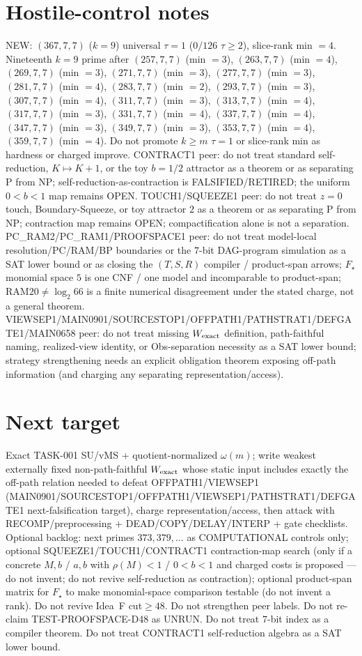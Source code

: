 \documentclass[11pt]{article}
\begin{document}
\section*{Hostile-control notes}
NEW: $(367,7,7)$ ($k{=}9$) universal $\tau{=}1$ ($0/126$ $\tau{\ge}2$), slice-rank min $=4$.
Nineteenth $k{=}9$ prime after $(257,7,7)$ (min $=3$), $(263,7,7)$ (min $=4$), $(269,7,7)$ (min $=3$), $(271,7,7)$ (min $=3$), $(277,7,7)$ (min $=3$), $(281,7,7)$ (min $=4$), $(283,7,7)$ (min $=2$), $(293,7,7)$ (min $=3$), $(307,7,7)$ (min $=4$), $(311,7,7)$ (min $=3$), $(313,7,7)$ (min $=4$), $(317,7,7)$ (min $=3$), $(331,7,7)$ (min $=4$), $(337,7,7)$ (min $=4$), $(347,7,7)$ (min $=3$), $(349,7,7)$ (min $=3$), $(353,7,7)$ (min $=4$), $(359,7,7)$ (min $=4$).
Do not promote $k{\ge}m$ $\tau{=}1$ or slice-rank min as hardness or charged improve.
CONTRACT1 peer: do not treat standard self-reduction, $K\mapsto K+1$, or the toy $b{=}1/2$ attractor as a theorem or as separating P from NP;
self-reduction-as-contraction is FALSIFIED/RETIRED; the uniform $0{<}b{<}1$ map remains OPEN.
TOUCH1/SQUEEZE1 peer: do not treat $z{=}0$ touch, Boundary-Squeeze, or toy attractor $2$ as a theorem or as separating P from NP;
contraction map remains OPEN; compactification alone is not a separation.
PC\_RAM2/PC\_RAM1/PROOFSPACE1 peer: do not treat model-local resolution/PC/RAM/BP boundaries or the $7$-bit DAG-program simulation as a SAT lower bound
or as closing the $(T,S,R)$ compiler / product-span arrows; $F_\star$ monomial space $5$ is one CNF / one model and incomparable to product-span;
RAM$20\neq\log_2 66$ is a finite numerical disagreement under the stated charge, not a general theorem.
VIEWSEP1/MAIN0901/SOURCESTOP1/OFFPATH1/PATHSTRAT1/DEFGATE1/MAIN0658 peer: do not treat missing $W_{\rm exact}$ definition,
path-faithful naming, realized-view identity, or Obs-separation necessity as a SAT lower bound;
strategy strengthening needs an explicit obligation theorem exposing off-path information
(and charging any separating representation/access).

\section*{Next target}
Exact TASK-001 SU/vMS + quotient-normalized $\omega(m)$; write weakest externally fixed non-path-faithful
$W_{\rm exact}$ whose static input includes exactly the off-path relation needed to defeat OFFPATH1/VIEWSEP1
(MAIN0901/SOURCESTOP1/OFFPATH1/VIEWSEP1/PATHSTRAT1/DEFGATE1 next-falsification target), charge representation/access,
then attack with RECOMP/preprocessing + DEAD/COPY/DELAY/INTERP + gate checklists.
Optional backlog: next primes $373,379,\ldots$ as COMPUTATIONAL controls only;
optional SQUEEZE1/TOUCH1/CONTRACT1 contraction-map search (only if a concrete $M,b$ / $a,b$ with $\rho(M){<}1$ / $0{<}b{<}1$ and charged costs is proposed --- do not invent; do not revive self-reduction as contraction);
optional product-span matrix for $F_\star$ to make monomial-space comparison testable (do not invent a rank).
Do not revive Idea~F cut$\ge48$. Do not strengthen peer labels.
Do not re-claim TEST-PROOFSPACE-D48 as UNRUN.
Do not treat $7$-bit index as a compiler theorem.
Do not treat CONTRACT1 self-reduction algebra as a SAT lower bound.
\end{document}
